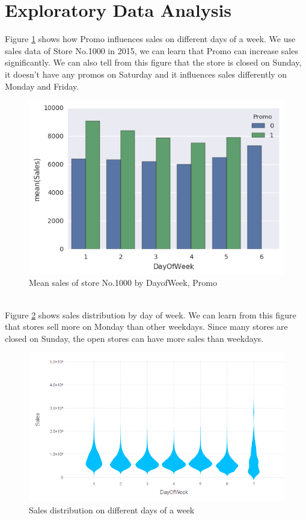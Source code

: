 \documentclass[11pt]{article}
\begin{document}
\section{Exploratory Data Analysis}
Figure \ref{fig:promo} shows how Promo influences sales on different days of a week. We use sales data of Store No.1000 in 2015, we can learn that Promo can increase sales significantly. We can also tell from this figure that the store is closed on Sunday, it doesn't have any promos on Saturday and it influences sales differently on Monday and Friday.\\
\begin{figure}[h!]
  \centering
  \includegraphics[scale=0.6]{promo.png}
  \caption{Mean sales of store No.1000 by DayofWeek, Promo}
  \label{fig:promo}
\end{figure}\\
Figure \ref{fig:dayofweek} shows sales distribution by day of week. We can learn from this figure that stores sell more on Monday than other weekdays. Since many stores are closed on Sunday, the open stores can have more sales than weekdays.\\
\begin{figure}[h!]
  \centering
  \includegraphics[scale=0.5]{DayOfWeek.PNG}
  \caption{Sales distribution on different days of a week}
  \label{fig:dayofweek}
\end{figure}\\
\end{document}
